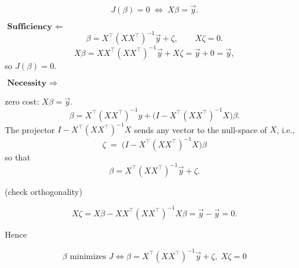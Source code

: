 \begin{answer} \\

$$
J(\beta)=0\;\Longleftrightarrow\;X\beta=\vec y .
$$

\(\textbf{Sufficiency }\Longleftarrow{}\)
$$
\beta=X^{\top}(XX^{\top})^{-1}\vec y+\zeta,\qquad X\zeta=0 .
$$
$$
X\beta
=XX^{\top}(XX^{\top})^{-1}\vec y+X\zeta
=\vec y+0
=\vec y,
$$
so $J(\beta)=0$.

\(\textbf{Necessity }\Longrightarrow{}\)

zero cost: $X\beta=\vec y$.
$$
     \beta = X^\top(XX^\top)^{-1}y + \bigl(I - X^\top(XX^\top)^{-1}X\bigr)\beta .
$$
The projector $I - X^\top(XX^\top)^{-1}X$ sends any vector to the null-space of $X$, i.e.,
$$
\boxed{\;\zeta \;=\; \bigl(I - X^{\top}(XX^{\top})^{-1}X\bigr)\beta\;}
$$
so that
$$
\beta
=X^{\top}(XX^{\top})^{-1}\vec y+\zeta .
$$

(check orthogonality)

$$
X\zeta
=X\beta-XX^{\top}(XX^{\top})^{-1}X\beta
=\vec y-\vec y
=0 .
$$

Hence

$$
\boxed{\;
\beta\text{ minimizes }J \iff
\beta=X^{\top}(XX^{\top})^{-1}\vec y+\zeta,\;X\zeta=0
\;}
$$
\end{answer}
